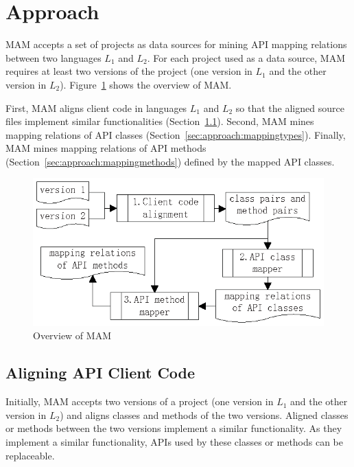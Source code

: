 \section{Approach}
\label{sec:approach}

MAM accepts a set of projects as data sources for mining API
mapping relations between two languages $L_1$ and $L_2$. 
For each project used as a data source,
MAM requires at least two versions of the project (one
version in $L_1$ and the other version in $L_2$).
Figure~\ref{fig:approach} shows the overview of MAM.

First, MAM aligns client code in languages $L_1$ and $L_2$
so that the aligned source files implement similar functionalities
(Section~\ref{sec:approach:acc}). Second, MAM mines
mapping relations of API classes (Section~\ref{sec:approach:mappingtypes}).
Finally, MAM mines mapping relations of API
methods (Section~\ref{sec:approach:mappingmethods}) defined by the mapped
API classes.

\begin{figure}[t]
\centering
\includegraphics[scale=1,clip]{figure/approach.eps}\vspace*{-3ex}
 \caption{Overview of MAM}\vspace*{-3.5ex}
 \label{fig:approach}
\end{figure}

\subsection{Aligning API Client Code}
\label{sec:approach:acc}

Initially, MAM accepts two versions of a project (one version in
$L_1$ and the other version in $L_2$) and aligns classes and methods
of the two versions. Aligned classes or methods
between the two versions implement a similar functionality. As they
implement a similar functionality, APIs used by these classes or methods can be
replaceable.

